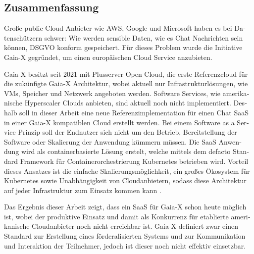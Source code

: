 \begin{otherlanguage}{ngerman}
	\chapter*{Zusammenfassung}

	Große public Cloud Anbieter wie AWS, Google und Microsoft haben es bei Datenschützern schwer:
	Wie werden sensible Daten, wie es Chat Nachrichten sein können, DSGVO konform gespeichert.
	Für dieses Problem wurde die Initiative Gaia-X gegründet, um einen europäischen Cloud Service anzubieten.

	Gaia-X besitzt seit 2021 mit Plusserver Open Cloud, die erste Referenzcloud für die zukünfigte Gaia-X Architektur,
	wobei aktuell nur Infrastrukturlösungen, wie \acp{VM}, Speicher und Netzwerk angeboten werden. 
	Software Services, wie amerikanische Hyperscaler Clouds anbieten, sind aktuell noch nicht implementiert.
	Deshalb soll in dieser Arbeit eine neue Referenzimplementation für einen Chat \ac{SaaS} in einer Gaia-X kompatiblen Cloud erstellt werden.
	Bei einem Software as a Service Prinzip soll der Endnutzer sich nicht um den Betrieb, Bereitstellung der Software
	oder Skalierung der Anwendung kümmern müssen. 
	Die \ac{SaaS} Anwendung wird als containerbasierte Lösung erstelt, welche mittels dem defacto Standard Framework für 
	Containerorchestrierung Kubernetes \cite{Burns2019} betrieben wird. Vorteil dieses Ansatzes ist die einfache Skalierungsmöglichkeit,
	ein großes Ökosystem für Kubernetes sowie Unabhängigkeit von Cloudanbietern, 
	sodass diese Architektur auf jeder Infrastruktur zum Einsatz kommen kann \cite{Burns2019}.

	Das Ergebnis dieser Arbeit zeigt, dass ein \ac{SaaS} für Gaia-X schon heute möglich ist, 
	wobei der produktive Einsatz und damit als Konkurrenz für etablierte amerikanische Cloudanbieter noch nicht erreichbar ist. 
	Gaia-X definiert zwar einen Standard zur Erstellung eines förderalisierten Systems und zur Kommunikation und Interaktion 
	der Teilnehmer, jedoch ist dieser noch nicht effektiv einsetzbar. 

\end{otherlanguage}